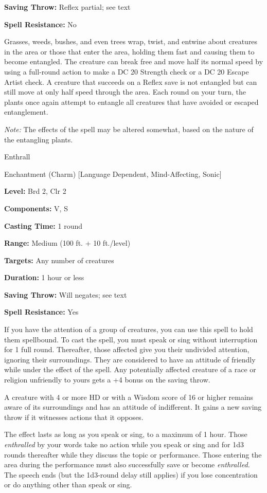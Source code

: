 \documentclass{article}
\begin{document}
\textbf{Saving Throw:} Reflex partial; see text

\textbf{Spell Resistance:} No

Grasses, weeds, bushes, and even trees wrap, twist, and entwine about creatures 
in the area or those that enter the area, holding them fast and causing them to 
become entangled. The creature can break free and move half its normal speed by 
using a full-round action to make a DC 20 Strength check or a DC 20 Escape Artist 
check. A creature that succeeds on a Reflex save is not entangled but can still 
move at only half speed through the area. Each round on your turn, the plants once 
again attempt to entangle all creatures that have avoided or escaped entanglement.

\textit{Note: }The effects of the spell may be altered somewhat, based on the nature 
of the entangling plants.

\vspace{12pt}
Enthrall

Enchantment (Charm) [Language Dependent, Mind-Affecting, Sonic]

\textbf{Level:} Brd 2, Clr 2

\textbf{Components:} V, S

\textbf{Casting Time:} 1 round

\textbf{Range: }Medium (100 ft. + 10 ft./level)

\textbf{Targets:} Any number of creatures

\textbf{Duration:} 1 hour or less

\textbf{Saving Throw: }Will negates; see text

\textbf{Spell Resistance:} Yes

If you have the attention of a group of creatures, you can use this spell to hold 
them spellbound. To cast the spell, you must speak or sing without interruption 
for 1 full round. Thereafter, those affected give you their undivided attention, 
ignoring their surroundings. They are considered to have an attitude of friendly 
while under the effect of the spell. Any potentially affected creature of a race 
or religion unfriendly to yours gets a +4 bonus on the saving throw.

A creature with 4 or more HD or with a Wisdom score of 16 or higher remains aware 
of its surroundings and has an attitude of indifferent. It gains a new saving throw 
if it witnesses actions that it opposes.

The effect lasts as long as you speak or sing, to a maximum of 1 hour. Those \textit{enthralled 
}by your words take no action while you speak or sing and for 1d3 rounds thereafter 
while they discuss the topic or performance. Those entering the area during the 
performance must also successfully save or become \textit{enthralled. }The speech 
ends (but the 1d3-round delay still applies) if you lose concentration or do anything 
other than speak or sing.
\end{document}
